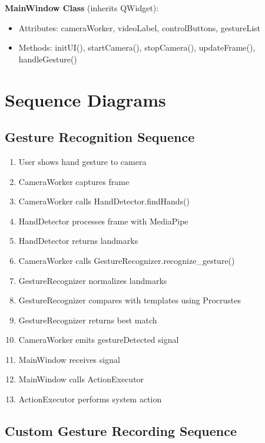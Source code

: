 \documentclass[12pt,a4paper]{report}
\begin{document}
\textbf{MainWindow Class} (inherits QWidget):
\begin{itemize}
    \item Attributes: cameraWorker, videoLabel, controlButtons, gestureList
    \item Methods: initUI(), startCamera(), stopCamera(), updateFrame(), handleGesture()
\end{itemize}

\section{Sequence Diagrams}

\subsection{Gesture Recognition Sequence}

\begin{enumerate}
    \item User shows hand gesture to camera
    \item CameraWorker captures frame
    \item CameraWorker calls HandDetector.findHands()
    \item HandDetector processes frame with MediaPipe
    \item HandDetector returns landmarks
    \item CameraWorker calls GestureRecognizer.recognize\_gesture()
    \item GestureRecognizer normalizes landmarks
    \item GestureRecognizer compares with templates using Procrustes
    \item GestureRecognizer returns best match
    \item CameraWorker emits gestureDetected signal
    \item MainWindow receives signal
    \item MainWindow calls ActionExecutor
    \item ActionExecutor performs system action
\end{enumerate}

\subsection{Custom Gesture Recording Sequence}
\end{document}

